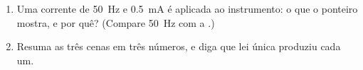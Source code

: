 \begin{problem}
\begin{enumerate}[resume]
        escala deixaria de ser linear: escreva a condição de equilíbrio
        com $\theta$ medido a partir da posição em que o plano da bobina
        contém $\vect B$.
  \item Uma corrente de \qty{50}{Hz} e  \qty{0.5}{mA} é aplicada ao
        instrumento: o que o ponteiro mostra, e por quê? (Compare \qty{50}{Hz}
        com a .)
  \item Resuma as três cenas em três números, e diga que lei única
        produziu cada um.
\end{enumerate}
\end{problem}
